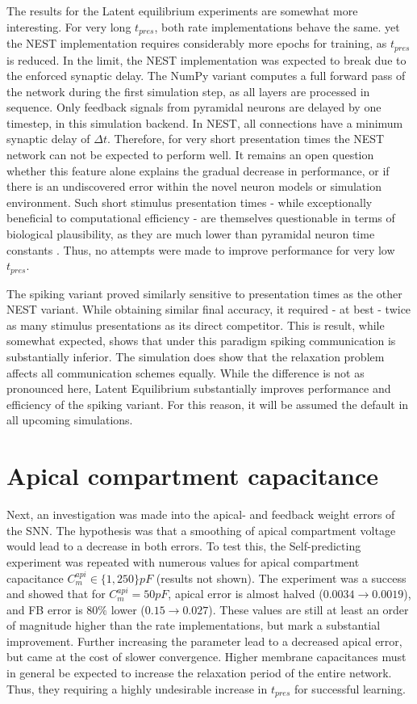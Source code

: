 The results for the Latent equilibrium experiments are somewhat more interesting. For very long $t_{pres}$, both rate
implementations behave the same. yet the NEST implementation requires considerably more epochs for training, as
$t_{pres}$ is reduced. In the limit, the NEST implementation was expected to break due to the enforced synaptic delay.
The NumPy variant computes a full forward pass of the network during the first simulation step, as all layers are
processed in sequence. Only feedback signals from pyramidal neurons are delayed by one timestep, in this simulation
backend. In NEST, all connections have a minimum synaptic delay of $\Delta t$. Therefore, for very short presentation
times the NEST network can not be expected to perform well. It remains an open question whether this feature alone
explains the gradual decrease in performance, or if there is an undiscovered error within the novel neuron models or
simulation environment. Such short stimulus presentation times - while exceptionally beneficial to computational
efficiency - are themselves questionable  in terms of biological plausibility, as they are much lower than pyramidal
neuron time constants \citep{McCormick1985}. Thus, no attempts were made to improve performance for very low $t_{pres}$.

The spiking variant proved similarly sensitive to presentation times as the other NEST variant. While obtaining similar
final accuracy, it required - at best - twice as many stimulus presentations as its direct competitor. This is result,
while somewhat expected, shows that under this paradigm spiking communication is substantially inferior. The simulation
does show that the relaxation problem affects all communication schemes equally. While the difference is not as
pronounced here, Latent Equilibrium substantially improves performance and efficiency of the spiking variant. For this
reason, it will be assumed the default in all upcoming simulations.



\section{Apical compartment capacitance}\label{sec-c-m-api}

Next, an investigation was made into the apical- and feedback weight errors of the SNN. The hypothesis was that a
smoothing of apical compartment voltage would lead to a decrease in both errors. To test this, the Self-predicting
experiment was repeated with numerous values for apical compartment capacitance $C_m^{api} \in \{ 1, 250 \} pF$
(results not shown). The experiment was a success and showed that for $C_m^{api} = 50pF$, apical error is almost halved
($0.0034 \rightarrow 0.0019$), and FB error is $80\%$ lower ($0.15 \rightarrow 0.027$). These values are
still at least an order of magnitude higher than the rate implementations, but mark a substantial improvement. Further
increasing the parameter lead to a decreased apical error, but came at the cost of slower convergence. Higher
membrane capacitances must in general be expected to increase the relaxation period of the entire network. Thus, they
requiring a highly undesirable increase in $t_{pres}$ for successful learning.

